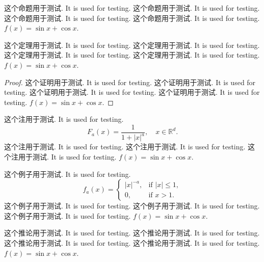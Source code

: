 \begin{proposition}\label{prop:test}
  这个命题用于测试. It is used for testing. 这个命题用于测试. It is used for testing. 这个命题用于测试. It is used for testing. 这个命题用于测试. It is used for testing. $f(x)=\sin x + \cos x$.
\end{proposition}

\begin{theorem}[option]\label{thm:test}
  这个定理用于测试. It is used for testing. 这个定理用于测试. It is used for testing. 这个定理用于测试. It is used for testing. 这个定理用于测试. It is used for testing. $f(x)=\sin x + \cos x$.
\end{theorem}

\begin{proof}
  这个证明用于测试. It is used for testing. 这个证明用于测试. It is used for testing. 这个证明用于测试. It is used for testing. 这个证明用于测试. It is used for testing. $f(x)=\sin x + \cos x$.
\end{proof}

\begin{remark}\label{rem:test}
  这个注用于测试. It is used for testing.
  \[
    F_a(x) = \frac{1}{1 + |x|^a}, \quad x \in \mathbb{R}^d.
  \]
  这个注用于测试. It is used for testing. 这个注用于测试. It is used for testing. 这个注用于测试. It is used for testing. $f(x)=\sin x + \cos x$.
\end{remark}

\begin{example}\label{ex:test}
  这个例子用于测试. It is used for testing.
  \begin{equation}\label{eq:test}
    f_a(x) =
    \begin{cases}
      |x|^{-a}, & \text{if } |x| \leq 1,\\
      0,        & \text{if } x > 1.
    \end{cases}
  \end{equation}
  这个例子用于测试. It is used for testing. 这个例子用于测试. It is used for testing. 这个例子用于测试. It is used for testing. $f(x)=\sin x + \cos x$.
\end{example}

\begin{corollary}\label{cor:test}
  这个推论用于测试. It is used for testing. 这个推论用于测试. It is used for testing. 这个推论用于测试. It is used for testing. 这个推论用于测试. It is used for testing. $f(x)=\sin x + \cos x$.
\end{corollary}
